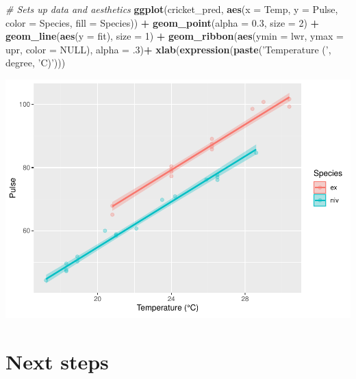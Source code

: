 \documentclass[
]{book}
\newenvironment{Shaded}{\begin{snugshade}}{\end{snugshade}}
\newcommand{\CommentTok}[1]{\textcolor[rgb]{0.56,0.35,0.01}{\textit{#1}}}
\newcommand{\DataTypeTok}[1]{\textcolor[rgb]{0.13,0.29,0.53}{#1}}
\newcommand{\DecValTok}[1]{\textcolor[rgb]{0.00,0.00,0.81}{#1}}
\newcommand{\FloatTok}[1]{\textcolor[rgb]{0.00,0.00,0.81}{#1}}
\newcommand{\KeywordTok}[1]{\textcolor[rgb]{0.13,0.29,0.53}{\textbf{#1}}}
\newcommand{\NormalTok}[1]{#1}
\newcommand{\OperatorTok}[1]{\textcolor[rgb]{0.81,0.36,0.00}{\textbf{#1}}}
\newcommand{\OtherTok}[1]{\textcolor[rgb]{0.56,0.35,0.01}{#1}}
\newcommand{\StringTok}[1]{\textcolor[rgb]{0.31,0.60,0.02}{#1}}
\begin{document}
\begin{Shaded}
\begin{Highlighting}[]
\CommentTok{# Sets up data and aesthetics}
\KeywordTok{ggplot}\NormalTok{(cricket_pred, }
       \KeywordTok{aes}\NormalTok{(}\DataTypeTok{x =}\NormalTok{ Temp, }\DataTypeTok{y =}\NormalTok{ Pulse, }\DataTypeTok{color =}\NormalTok{ Species, }\DataTypeTok{fill =}\NormalTok{ Species)) }\OperatorTok{+}
\StringTok{  }\KeywordTok{geom_point}\NormalTok{(}\DataTypeTok{alpha =} \FloatTok{0.3}\NormalTok{, }\DataTypeTok{size =} \DecValTok{2}\NormalTok{) }\OperatorTok{+}
\StringTok{  }\KeywordTok{geom_line}\NormalTok{(}\KeywordTok{aes}\NormalTok{(}\DataTypeTok{y =}\NormalTok{ fit), }\DataTypeTok{size =} \DecValTok{1}\NormalTok{) }\OperatorTok{+}
\StringTok{  }\KeywordTok{geom_ribbon}\NormalTok{(}\KeywordTok{aes}\NormalTok{(}\DataTypeTok{ymin =}\NormalTok{ lwr, }\DataTypeTok{ymax =}\NormalTok{ upr, }\DataTypeTok{color =} \OtherTok{NULL}\NormalTok{), }\DataTypeTok{alpha =} \FloatTok{.3}\NormalTok{)}\OperatorTok{+}
\StringTok{  }\KeywordTok{xlab}\NormalTok{(}\KeywordTok{expression}\NormalTok{(}\KeywordTok{paste}\NormalTok{(}\StringTok{'Temperature ('}\NormalTok{, degree, }\StringTok{'C)'}\NormalTok{)))  }
\end{Highlighting}
\end{Shaded}

\includegraphics{worstr_files/figure-latex/unnamed-chunk-214-1.pdf}

\hypertarget{next8}{%
\section{Next steps}\label{next8}}
\end{document}
